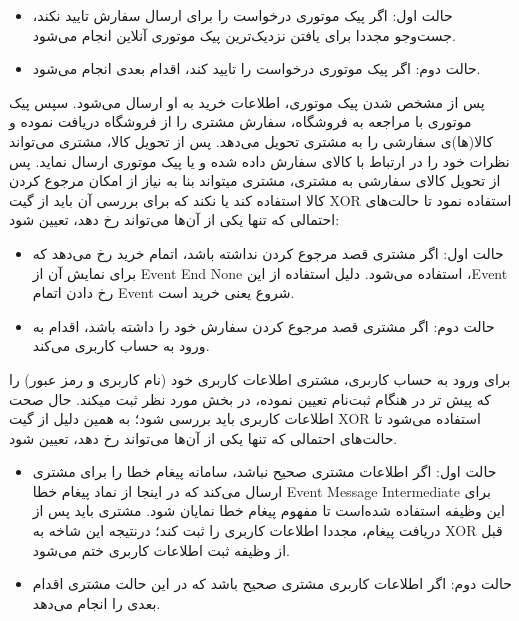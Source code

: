 \documentclass[14pt]{article}
\begin{document}
\begin{flushright}
\begin{itemize}
\item حالت اول: اگر پیک موتوری درخواست را برای ارسال سفارش تایید نکند، جست‌و‌جو مجددا برای یافتن نزدیک‌ترین پیک موتوری آنلاین انجام می‌شود.
\item حالت دوم: اگر پیک موتوری درخواست را تایید کند، اقدام بعدی انجام می‌شود.
\end{itemize}
\end{flushright}

پس از مشخص شدن پیک موتوری، اطلاعات خرید به او ارسال می‌شود. سپس پیک موتوری با مراجعه به فروشگاه، سفارش مشتری را از فروشگاه دریافت نموده و کالا(ها)ی سفارشی را به مشتری تحویل می‌دهد. پس از تحویل کالا، مشتری می‌تواند نظرات خود را در ارتباط با کالای سفارش داده شده و یا پیک موتوری ارسال نماید.
پس از تحویل کالای سفارشی به مشتری، مشتری میتواند بنا به نیاز از امکان مرجوع کردن کالا استفاده کند یا نکند که برای بررسی آن باید از گیت XOR استفاده نمود تا حالت‌های احتمالی که تنها یکی از آن‌ها می‌تواند رخ دهد، تعیین شود:

\begin{flushright}
\begin{itemize}
\item حالت اول: اگر مشتری قصد مرجوع کردن نداشته باشد، اتمام خرید رخ می‌دهد که برای نمایش آن از Event End None استفاده می‌شود. دلیل استفاده از این ،Event رخ دادن اتمام Event شروع یعنی خرید است.
\item حالت دوم: اگر مشتری قصد مرجوع کردن سفارش خود را داشته باشد، اقدام به ورود به حساب کاربری می‌کند.
\end{itemize}
\end{flushright}

برای ورود به حساب کاربری، مشتری اطلاعات کاربری خود (نام کاربری و رمز عبور) را که پیش تر در هنگام ثبت‌نام تعیین نموده، در بخش مورد نظر ثبت میکند. حال صحت اطلاعات کاربری باید بررسی شود؛ به همین دلیل از گیت XOR  استفاده می‌شود تا حالت‌های احتمالی که تنها یکی از آن‌ها می‌تواند رخ دهد، تعیین شود.

\begin{flushright}
\begin{itemize}
\item حالت اول: اگر اطلاعات مشتری صحیح نباشد، سامانه پیغام خطا را برای مشتری ارسال می‌کند که در اینجا از نماد پیغام خطا Event Message Intermediate برای این وظیفه استفاده شده‌است تا مفهوم پیغام خطا نمایان شود. مشتری باید پس از دریافت پیغام، مجددا اطلاعات کاربری را ثبت کند؛ درنتیجه این شاخه به XOR قبل از وظیفه ثبت اطلاعات کاربری ختم می‌شود.
\item حالت دوم: اگر اطلاعات کاربری مشتری صحیح باشد که در این حالت مشتری اقدام بعدی را انجام می‌دهد. 
\end{itemize}
\end{flushright}
\end{document}
